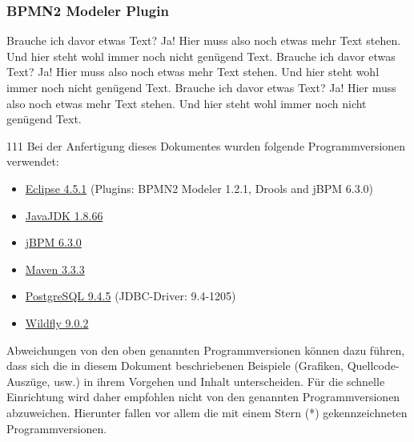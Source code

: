 \subsubsection{BPMN2 Modeler Plugin}
Brauche ich davor etwas Text? Ja! Hier muss also noch etwas mehr Text stehen. Und hier steht wohl immer noch nicht genügend Text. Brauche ich davor etwas Text? Ja! Hier muss also noch etwas mehr Text stehen. Und hier steht wohl immer noch nicht genügend Text. Brauche ich davor etwas Text? Ja! Hier muss also noch etwas mehr Text stehen. Und hier steht wohl immer noch nicht genügend Text.
\begin{info}{111}
	Bei der Anfertigung dieses Dokumentes wurden folgende Programmversionen verwendet:
	\begin{itemize}
		\item \href{http://www.eclipse.org/downloads/download.php?file=/technology/epp/downloads/release/mars/1/eclipse-jee-mars-1-win32-x86_64.zip}{Eclipse 4.5.1} (Plugins: BPMN2 Modeler 1.2.1, Drools and jBPM 6.3.0)
		\item \href{http://download.oracle.com/otn-pub/java/jdk/8u66-b17/jdk-8u66-windows-x64.exe}{JavaJDK 1.8.66}
		\item \href{http://sourceforge.net/projects/jbpm/files/jBPM\%206/jbpm-6.3.0.Final/}{jBPM 6.3.0}\star
		\item \href{http://mirror.23media.de/apache/maven/maven-3/3.3.3/binaries/apache-maven-3.3.3-bin.zip}{Maven 3.3.3}
		\item \href{http://get.enterprisedb.com/postgresql/postgresql-9.4.5-1-windows-x64.exe}{PostgreSQL 9.4.5} (JDBC-Driver: 9.4-1205)
		\item \href{http://download.jboss.org/wildfly/9.0.2.Final/wildfly-9.0.2.Final.zip}{Wildfly 9.0.2}\star
	\end{itemize}
	Abweichungen von den oben genannten Programmversionen können dazu führen, dass sich die in diesem Dokument beschriebenen Beispiele (Grafiken, Quellcode-Auszüge, usw.) in ihrem Vorgehen und Inhalt unterscheiden. Für die schnelle Einrichtung wird daher empfohlen nicht von den genannten Programmversionen abzuweichen. Hierunter fallen vor allem die mit einem Stern (*) gekennzeichneten Programmversionen.
\end{info}

